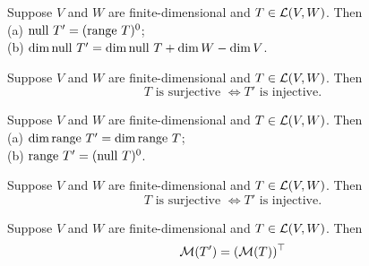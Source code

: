 \documentclass{extarticle}
\begin{document}
\begin{lemma}
    Suppose \(V\) and \(W\) are finite-dimensional and \(T \in \mathcal{L}(V, W)\). Then \\ 
    (a) \(\text{null } T' = (\text{range } T)^0\); \\ 
    (b) \(\dim \text{null } T' = \dim \text{null } T + \dim W - \dim V\).
\end{lemma}

\begin{thm}
    Suppose \(V\) and \(W\) are finite-dimensional and \(T \in \mathcal{L}(V, W)\). Then 
    \[T \text{ is surjective } \Leftrightarrow T' \text{ is injective}.\]
\end{thm}

\begin{lemma}
    Suppose \(V\) and \(W\) are finite-dimensional and \(T \in \mathcal{L}(V, W)\). Then \\ 
    (a) \(\dim \text{range } T' = \dim \text{range } T\); \\ 
    (b) \(\text{range } T' = (\text{null } T)^0\).
\end{lemma}

\begin{thm}
    Suppose \(V\) and \(W\) are finite-dimensional and \(T \in \mathcal{L}(V, W)\). Then 
    \[T \text{ is surjective } \Leftrightarrow T' \text{ is injective}.\]
\end{thm}


\begin{thm}
    Suppose \(V\) and \(W\) are finite-dimensional and \(T \in \mathcal{L}(V, W)\). Then 
    \[\mathcal{M}(T') = (\mathcal{M}(T))^\top\]
\end{thm}
\end{document}
